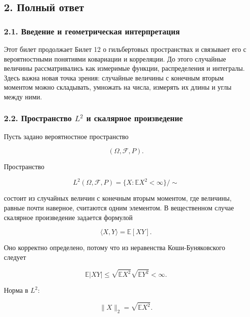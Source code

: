 \documentclass[
  11pt,
  a4paper,
]{article}
\begin{document}
\subsection{2. Полный
ответ}\label{ux43fux43eux43bux43dux44bux439-ux43eux442ux432ux435ux442}

\subsubsection{2.1. Введение и геометрическая
интерпретация}\label{ux432ux432ux435ux434ux435ux43dux438ux435-ux438-ux433ux435ux43eux43cux435ux442ux440ux438ux447ux435ux441ux43aux430ux44f-ux438ux43dux442ux435ux440ux43fux440ux435ux442ux430ux446ux438ux44f}

Этот билет продолжает Билет 12 о гильбертовых пространствах и связывает
его с вероятностными понятиями ковариации и корреляции. До этого
случайные величины рассматривались как измеримые функции, распределения
и интегралы. Здесь важна новая точка зрения: случайные величины с
конечным вторым моментом можно складывать, умножать на числа, измерять
их длины и углы между ними.

\subsubsection{\texorpdfstring{2.2. Пространство \(L^2\) и скалярное
произведение}{2.2. Пространство L\^{}2 и скалярное произведение}}\label{ux43fux440ux43eux441ux442ux440ux430ux43dux441ux442ux432ux43e-l2-ux438-ux441ux43aux430ux43bux44fux440ux43dux43eux435-ux43fux440ux43eux438ux437ux432ux435ux434ux435ux43dux438ux435}

Пусть задано вероятностное пространство

\[
(\Omega,\mathcal F,P).
\]

Пространство

\[
L^2(\Omega,\mathcal F,P)
=
\{X:\mathbb E X^2<\infty\}/\sim
\]

состоит из случайных величин с конечным вторым моментом, где величины,
равные почти наверное, считаются одним элементом. В вещественном случае
скалярное произведение задается формулой

\[
\langle X,Y\rangle=\mathbb E[XY].
\]

Оно корректно определено, потому что из неравенства Коши-Буняковского
следует

\[
\mathbb E|XY|
\le
\sqrt{\mathbb EX^2}\sqrt{\mathbb EY^2}
<\infty.
\]

Норма в \(L^2\):

\[
\|X\|_2=\sqrt{\mathbb EX^2}.
\]
\end{document}

